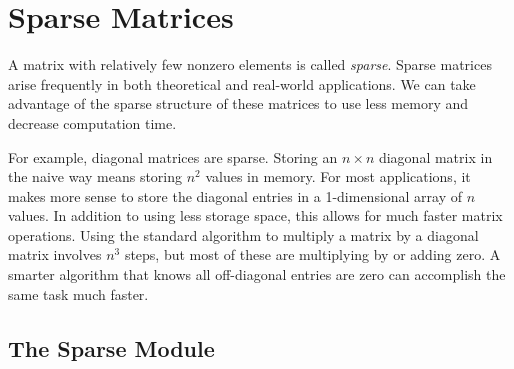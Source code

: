 \section*{Sparse Matrices} %

A matrix with relatively few nonzero elements is called \emph{sparse}.
Sparse matrices arise frequently in both theoretical and real-world applications.
We can take advantage of the sparse structure of these matrices to use less memory and decrease computation time.

For example, diagonal matrices are sparse.
Storing an $n \times n$ diagonal matrix in the naive way means storing $n^2$ values in memory.
For most applications, it makes more sense to store the diagonal entries in a 1-dimensional array of $n$ values.
In addition to using less storage space, this allows for much faster matrix operations.
Using the standard algorithm to multiply a matrix by a diagonal matrix involves $n^3$ steps, but most of these are multiplying by or adding zero.
A smarter algorithm that knows all off-diagonal entries are zero can accomplish the same task much faster.

\subsection*{The Sparse Module} %


